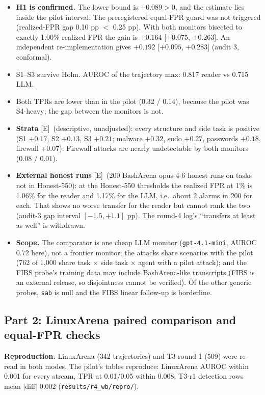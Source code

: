 \documentclass[11pt]{article}
\newcommand{\tE}{\textsf{\scriptsize\textcolor{ink2}{[E]}}\xspace}
\begin{document}
\begin{itemize}
\item \textbf{H1 is confirmed.} The lower bound is $+0.089>0$, and the estimate lies inside the pilot interval. The preregistered equal-FPR guard was not triggered (realized-FPR gap 0.10 pp $<$ 0.25 pp). With both monitors bisected to exactly 1.00\% realized FPR the gain is $+0.164$ [$+0.075$, $+0.263$]. An independent re-implementation gives $+0.192$ [$+0.095$, $+0.283$] (audit 3, conformal).
\item S1--S3 survive Holm. AUROC of the trajectory max: 0.817 reader vs 0.715 LLM.
\item Both TPRs are lower than in the pilot (0.32 / 0.14), because the pilot was S4-heavy; the gap between the monitors is not.
\item \textbf{Strata} \tE\ (descriptive, unadjusted): every structure and side task is positive (S1 $+0.17$, S2 $+0.13$, S3 $+0.21$; malware $+0.32$, sudo $+0.27$, passwords $+0.18$, firewall $+0.07$). Firewall attacks are nearly undetectable by both monitors (0.08 / 0.01).
\item \textbf{External honest runs} \tE\ (200 BashArena opus-4-6 honest runs on tasks not in Honest-550): at the Honest-550 thresholds the realized FPR at 1\% is 1.06\% for the reader and 1.17\% for the LLM, i.e.\ about 2 alarms in 200 for each. That shows no worse transfer for the reader but cannot rank the two (audit-3 gap interval $[-1.5, +1.1]$ pp). The round-4 log's ``transfers at least as well'' is withdrawn.
\item \textbf{Scope.} The comparator is one cheap LLM monitor (\texttt{gpt-4.1-mini}, AUROC 0.72 here), not a frontier monitor; the attacks share scenarios with the pilot (762 of 1{,}000 share task $\times$ side task $\times$ agent with a pilot attack); and the FIBS probe's training data may include BashArena-like transcripts (FIBS is an external release, so disjointness cannot be verified). Of the other generic probes, \texttt{sab} is null and the FIBS linear follow-up is borderline.
\end{itemize}

\subsection{Part 2: LinuxArena paired comparison and equal-FPR checks}\label{sec:r4p2}
\textbf{Reproduction.} LinuxArena (342 trajectories) and T3 round 1 (509) were re-read in both modes. The pilot's tables reproduce: LinuxArena AUROC within 0.001 for every stream, TPR at 0.01/0.05 within 0.008, T3-r1 detection rows mean $|$diff$|$ 0.002 (\nolinkurl{results/r4_wb/repro/}).
\end{document}
